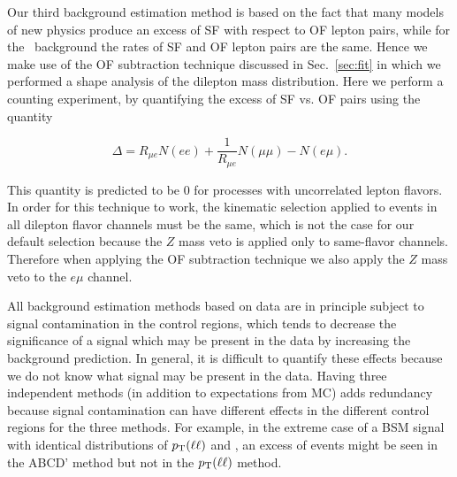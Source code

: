 Our third background estimation method is based on the fact that many models of new physics
produce an excess of SF with respect to OF lepton pairs, while for the \ttbar\ background the
rates of SF and OF lepton pairs are the same. Hence we make use of the OF subtraction technique
discussed in Sec.~\ref{sec:fit} in which we performed a shape analysis of the dilepton mass distribution.
Here we perform a counting experiment, by quantifying the excess of SF vs. OF pairs using the
quantity

\begin{equation}
\label{eq:ofhighpt}
\Delta = R_{\mu e}N(ee) + \frac{1}{R_{\mu e}}N(\mu\mu) - N(e\mu).
\end{equation}

This quantity is predicted to be 0 for processes with 
uncorrelated lepton flavors. In order for this technique to work, the kinematic selection 
applied to events in all dilepton flavor channels must be the same, which is not the case 
for our default selection because the $Z$ mass veto is applied only to same-flavor channels.
Therefore when applying the OF subtraction technique we also apply the $Z$ mass veto
to the $e\mu$ channel. 

All background estimation methods based on data are in principle subject to signal contamination
in the control regions, which tends to decrease the significance of a signal
which may be present in the data by increasing the background prediction.
In general, it is difficult to quantify these effects because we 
do not know what signal may be present in the data.  Having three
independent methods (in addition to expectations from MC)
adds redundancy because signal contamination can have different effects
in the different control regions for the three methods.
For example, in the extreme case of a
BSM signal with identical distributions of $p_{\mathrm{T}}(\ell \ell)$ and \MET, an excess of events might be seen 
in the ABCD' method but not in the $p_{\mathrm{T}}(\ell \ell)$ method.

